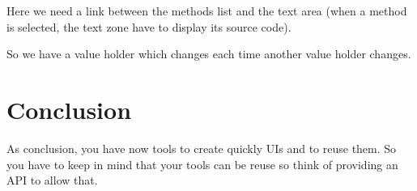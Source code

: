 \documentclass[a4paper,10pt,twoside]{book}
\begin{document}
Here we need a link between the methods list and the text area (when a method is selected, the text zone have to display its source code).

So we have a value holder which changes each time another value holder changes.


\section{Conclusion}

As conclusion, you have now tools to create quickly UIs and to reuse them.
So you have to keep in mind that your tools can be reuse so think of providing an API to allow that.

\ifx\wholebook\relax\else
   
   
\end{document}

